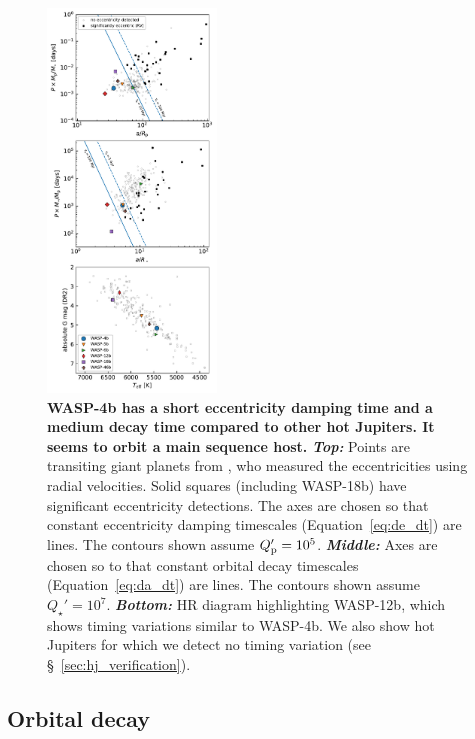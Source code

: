 \documentclass[12pt,twocolumn,tighten]{aastex62}
\begin{document}
\begin{figure}[t!]
  \begin{center}
    \includegraphics[width=0.40\textwidth]{f4.pdf}
  \end{center}
  \vspace{-0.5cm}
  \caption{
    {\bf WASP-4b has a short eccentricity damping time and a medium
    decay time compared to other hot Jupiters.  It seems to orbit a
    main sequence host.
    }
    {\bf \it Top:}
    Points are
    transiting giant planets from \citet{bonomo_gaps_2017}, who
    measured the eccentricities using radial velocities.  Solid
    squares (including WASP-18b) have significant eccentricity
    detections.  The axes are chosen so that constant eccentricity
    damping timescales (Equation~\ref{eq:de_dt}) are lines.  The
    contours shown assume $Q_{\rm p}' = 10^5$.
    {\bf \it Middle:} 
    Axes are chosen so to that constant orbital decay timescales
    (Equation~\ref{eq:da_dt}) are lines.  The contours shown assume
    $Q_\star' = 10^7$.
    {\bf \it Bottom:}
    HR diagram highlighting WASP-12b, which shows timing variations
    similar to WASP-4b.  We also show hot Jupiters for which we
    detect no timing variation (see \S~\ref{sec:hj_verification}).
    \label{fig:context}
  }
\end{figure}

 
\subsection{Orbital decay}
\end{document}
